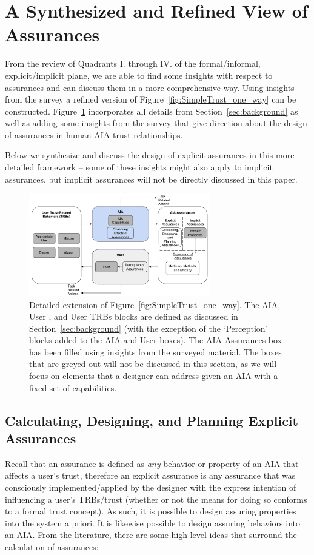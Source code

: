 \section{A Synthesized and Refined View of Assurances} \label{sec:synthesis}
    From the review of Quadrants I. through IV. of the formal/informal, explicit/implicit plane, we are able to find some insights with respect to assurances and can discuss them in a more comprehensive way. Using insights from the survey a refined version of Figure~\ref{fig:SimpleTrust_one_way} can be constructed. Figure~\ref{fig:refined_assurances} incorporates all details from Section~\ref{sec:background} as well as adding some insights from the survey that give direction about the design of assurances in human-AIA trust relationships. 
   
   Below we synthesize and discuss the design of explicit assurances in this more detailed framework -- some of these insights might also apply to implicit assurances, but implicit assurances will not be directly discussed in this paper.

    \begin{figure}[htbp]
        \centering
        \includegraphics[width=0.7\textwidth]{Figures/RefinedTrust_one_way}
        \caption{Detailed extension of Figure~\ref{fig:SimpleTrust_one_way}. The AIA, User , and User TRBs blocks are defined as discussed in Section~\ref{sec:background} (with the exception of the `Perception' blocks added to the AIA and User boxes). The AIA Assurances box has been filled using insights from the surveyed material. The boxes that are greyed out will not be discussed in this section, as we will focus on elements that a designer can address given an AIA with a fixed set of capabilities.}
        \label{fig:refined_assurances}
    \end{figure}

\subsection{Calculating, Designing, and Planning Explicit Assurances}
    Recall that an assurance is defined as \emph{any} behavior or property of an AIA that affects a user's trust, therefore an explicit assurance is any assurance that was consciously implemented/applied by the designer with the express intention of influencing a user's TRBs/trust (whether or not the means for doing so conforms to a formal trust concept). As such, it is possible to design assuring properties into the system a priori. It is likewise possible to design assuring behaviors into an AIA. From the literature, there are some high-level ideas that surround the calculation of assurances: 

